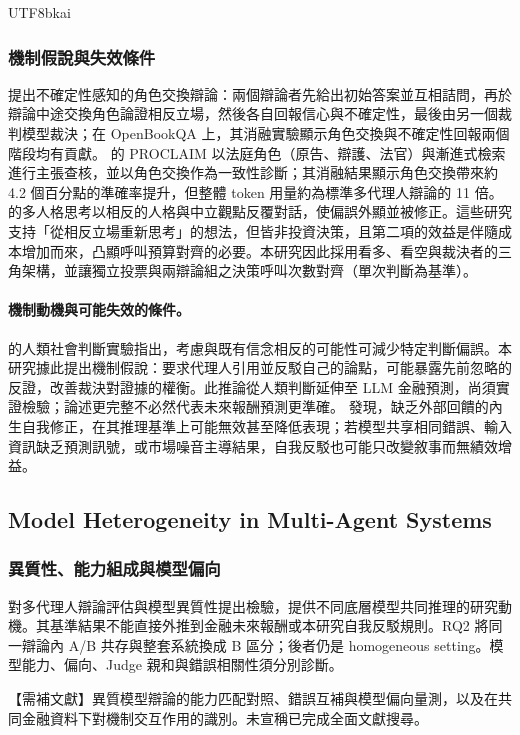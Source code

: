 \documentclass[12pt,a4paper]{article}
\begin{document}
\begin{CJK}{UTF8}{bkai}
\subsubsection{機制假說與失效條件}
\citet{liu2025roleswitch} 提出不確定性感知的角色交換辯論：兩個辯論者先給出初始答案並互相詰問，再於辯論中途交換角色論證相反立場，然後各自回報信心與不確定性，最後由另一個裁判模型裁決；在 OpenBookQA 上，其消融實驗顯示角色交換與不確定性回報兩個階段均有貢獻。\citet{chowdhury2026proclaim} 的 PROCLAIM 以法庭角色（原告、辯護、法官）與漸進式檢索進行主張查核，並以角色交換作為一致性診斷；其消融結果顯示角色交換帶來約 4.2 個百分點的準確率提升，但整體 token 用量約為標準多代理人辯論的 11 倍。\citet{chen2026mpt} 的多人格思考以相反的人格與中立觀點反覆對話，使偏誤外顯並被修正。這些研究支持「從相反立場重新思考」的想法，但皆非投資決策，且第二項的效益是伴隨成本增加而來，凸顯呼叫預算對齊的必要。本研究因此採用看多、看空與裁決者的三角架構，並讓獨立投票與兩辯論組之決策呼叫次數對齊（單次判斷為基準）。\paragraph{機制動機與可能失效的條件。}
\citet{lord1984opposite} 的人類社會判斷實驗指出，考慮與既有信念相反的可能性可減少特定判斷偏誤。本研究據此提出機制假說：要求代理人引用並反駁自己的論點，可能暴露先前忽略的反證，改善裁決對證據的權衡。此推論從人類判斷延伸至 LLM 金融預測，尚須實證檢驗；論述更完整不必然代表未來報酬預測更準確。\citet{huang2024selfcorrect} 發現，缺乏外部回饋的內生自我修正，在其推理基準上可能無效甚至降低表現；若模型共享相同錯誤、輸入資訊缺乏預測訊號，或市場噪音主導結果，自我反駁也可能只改變敘事而無績效增益。


\subsection{Model Heterogeneity in Multi-Agent Systems}

\subsubsection{異質性、能力組成與模型偏向}

\citet{zhang2025stop} 對多代理人辯論評估與模型異質性提出檢驗，提供不同底層模型共同推理的研究動機。其基準結果不能直接外推到金融未來報酬或本研究自我反駁規則。RQ2 將同一辯論內 A/B 共存與整套系統換成 B 區分；後者仍是 homogeneous setting。模型能力、偏向、Judge 親和與錯誤相關性須分別診斷。

【需補文獻】異質模型辯論的能力匹配對照、錯誤互補與模型偏向量測，以及在共同金融資料下對機制交互作用的識別。未宣稱已完成全面文獻搜尋。


\end{CJK}
\end{document}
